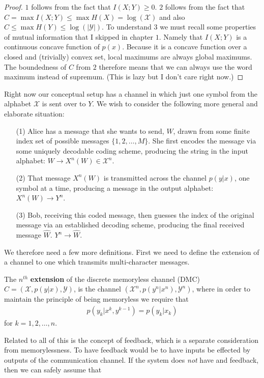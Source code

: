 \begin{proof}
	$1$ follows from the fact that $I(X;Y) \geq 0$. $2$ follows from the fact that $C = \max I(X;Y) \leq \max H(X) = \log(\mathcal{X})$ and also $C \leq \max H(Y) \leq  \log(|\mathcal{Y}|)$. To understand $3$ we must recall some properties of mutual information that I skipped in chapter $1$. Namely that $I(X;Y)$ is a continuous concave function of $p(x)$. Because it is a concave function over a closed and (trivially) convex set, local maximums are always global maximums. The boundedness of $C$ from $2$ therefore means that we can always use the word maximum instead of supremum. (This is lazy but I don't care right now.) 
\end{proof}
Right now our conceptual setup has a channel in which just one symbol from the alphabet $\mathcal{X}$ is sent over to $Y$. We wish to consider the following more general and elaborate situation:
\begin{itemize}
	\item[(1)] Alice has a message that she wants to send, $W$, drawn from some finite index set of possible messages $\{1,2,\ldots,M\}$. She first encodes the message via some uniquely decodable coding scheme, producing the string in the input alphabet: $W \to X^n(W) \in \mathcal{X}^n$. 
	\item[(2)] That message $X^n(W)$ is transmitted across the channel $p(y|x)$, one symbol at a time, producing a message in the output alphabet: $X^n(W) \to Y^n$. \\
	\item[(3)] Bob, receiving this coded message, then guesses the index of the original message via an established decoding scheme, producing the final received message $\hat{W}$. $Y^n \to \hat{W}$. 
\end{itemize}
We therefore need a few more definitions. First we need to define the extension of a channel to one which transmits multi-character messages.
\begin{definition}
	The $n^{th}$ \textbf{extension} of the discrete memoryless channel (DMC) $C = (\mathcal{X},p(y|x),\mathcal{Y})$, is the channel $(\mathcal{X}^n,p(y^n|x^n),\mathcal{Y}^n)$, where in order to maintain the principle of being memoryless we require that 
	\begin{align}
		p(y_k|x^k,y^{k-1}) = p(y_k|x_k)
	\end{align}
	for $k = 1,2,\ldots,n$. 
\end{definition}
Related to all of this is the concept of feedback, which is a separate consideration from memorylessness. To have feedback would be to have inputs be effected by outputs of the communication channel. If the system does \emph{not} have and feedback, then we can safely assume that 
